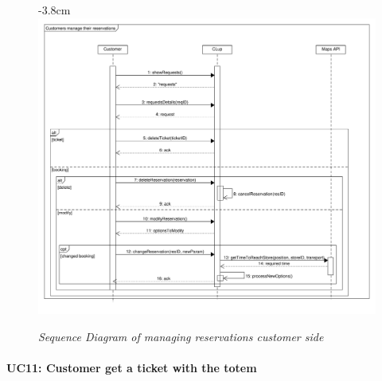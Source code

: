 \documentclass{article}
\begin{document}
			\begin{figure}[!htb]
				\begin{adjustwidth} {-3.8cm}{}
					\centering
					\includegraphics[scale=0.5]{SD/10_manageReservation(customer).pdf}\\
					\caption{\emph{Sequence Diagram of managing reservations customer side}}
				\end{adjustwidth}
			\end{figure}
		\newpage
		
			\paragraph{UC11: Customer get a ticket with the totem}
			
\end{document}
